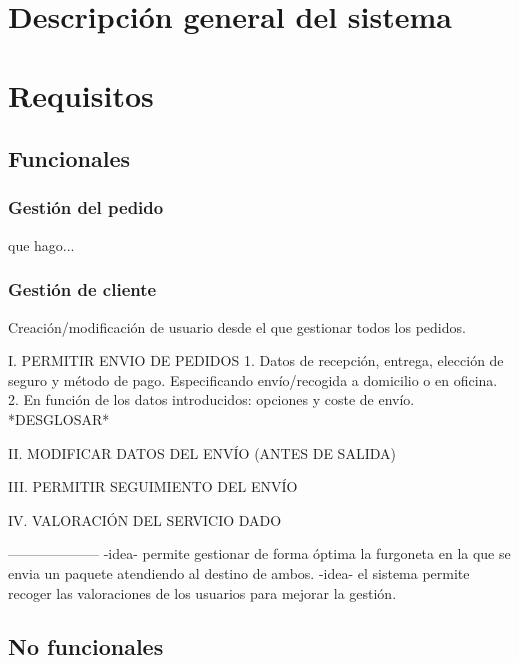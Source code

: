 \newpage

\section{Descripción general del sistema}

\newpage

\section{Requisitos}
\subsection{Funcionales}
\subsubsection{Gestión del pedido}
que hago...

\subsubsection{Gestión de cliente}
Creación/modificación de usuario desde el que gestionar todos los pedidos.

I. PERMITIR ENVIO DE PEDIDOS
1. Datos de recepción, entrega, elección de seguro y método de pago. Especificando envío/recogida a domicilio o en oficina.
2. En función de los datos introducidos: opciones y coste de envío.
*DESGLOSAR*

II. MODIFICAR DATOS DEL ENVÍO (ANTES DE SALIDA)

III. PERMITIR SEGUIMIENTO DEL ENVÍO

IV. VALORACIÓN DEL SERVICIO DADO






--------------------
-idea- permite gestionar de forma óptima la furgoneta en la que se envia un paquete atendiendo al destino de ambos.
-idea- el sistema permite recoger las valoraciones de los usuarios para mejorar la gestión.
\newpage
\subsection{No funcionales}

